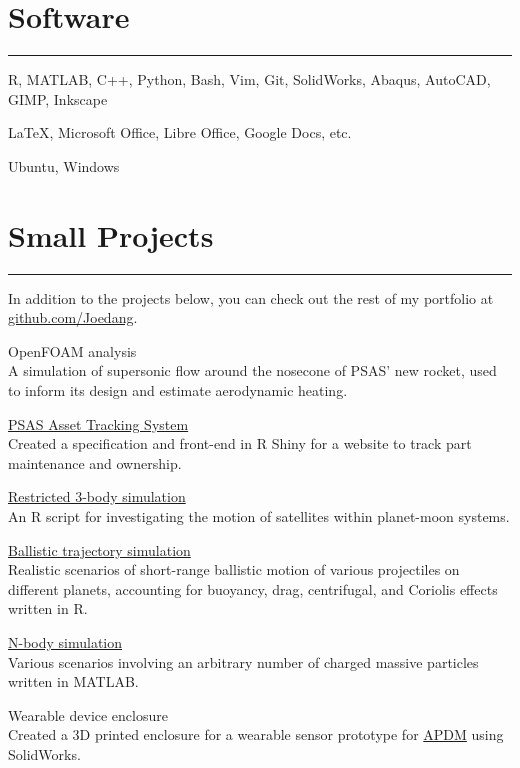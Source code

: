 \section{Software}

\noindent\rule{\textwidth}{\hlinewidth}
    \begin{innerlist}
        \item R, MATLAB, C++, Python, Bash, Vim, Git, SolidWorks, Abaqus, AutoCAD, GIMP, Inkscape
        \item \LaTeX, Microsoft Office, Libre Office, Google Docs, etc.
	\item Ubuntu, Windows
    \end{innerlist}
\vfill
\section{Small Projects}
\noindent\rule{\textwidth}{\hlinewidth}
In addition to the projects below, you can check out the rest of my portfolio at \url{github.com/Joedang}.
	\begin{innerlist}
	\item OpenFOAM analysis\\
	A simulation of supersonic flow around the nosecone of PSAS' new rocket, used to inform its design and estimate aerodynamic heating.
	\item \href{https://github.com/joedang/pats}{PSAS Asset Tracking System} \\
	Created a specification and front-end in R Shiny for a website to track part maintenance and ownership.
	\item \href{https://github.com/Joedang/restricted\_three\_body\_problem}{Restricted 3-body simulation} \\
	An R script for investigating the motion of satellites within planet-moon systems. 
	\item \href{https://github.com/Joedang/Portfolio/tree/master/projectile}{Ballistic trajectory simulation} \\
	Realistic scenarios of short-range ballistic motion of various projectiles on different planets, accounting for buoyancy, drag, centrifugal, and Coriolis effects written in R.
	\item \href{https://github.com/Joedang/Portfolio/tree/master/MATLAB\_orbits}{N-body simulation} \\
	Various scenarios involving an arbitrary number of charged massive particles written in MATLAB.
	\item Wearable device enclosure \\
	Created a 3D printed enclosure for a wearable sensor prototype for \href{https://www.apdm.com/}{APDM} using SolidWorks.
	\end{innerlist}
